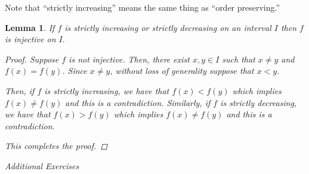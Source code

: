 \documentclass[11pt]{article}
\newtheorem{lemma}[theorem]{Lemma}
\theoremstyle{definition}
\numberwithin{equation}{section}
\begin{document}
Note that ``strictly increasing'' means the same thing as ``order preserving.''

\begin{lemma} If $f$ is strictly increasing or strictly decreasing on an interval $I$ then $f$ is injective on $I.$
\begin{proof}
Suppose $f$ is not injective. Then, there exist $x,y \in I$ such that $x \neq y$ and $f(x)=f(y)$. Since $x \neq y$, without loss of generality suppose that $x<y$. 

Then, if $f$ is strictly increasing, we have that $f(x)<f(y)$ which implies $f(x) \neq f(y)$ and this is a contradiction. Similarly, if $f$ is strictly decreasing, we have that $f(x)>f(y)$ which implies $f(x) \neq f(y)$ and this is a contradiction.

This completes the proof.


\renewcommand\qedsymbol{QED}
\end{proof}

\end{lemma}


\bigskip

\begin{center}
{\em Additional Exercises}
\end{center}
\end{document}
